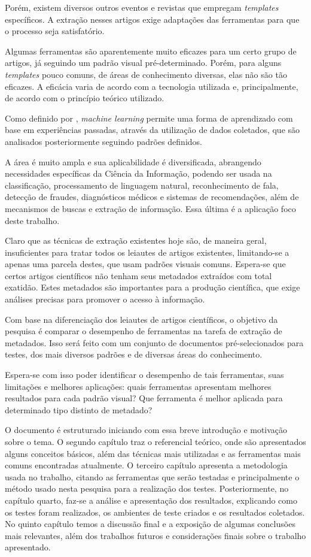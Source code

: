 Porém, existem diversos outros eventos e revistas que empregam \textit{templates} específicos. A extração nesses artigos exige adaptações das ferramentas para que o processo seja satisfatório.

Algumas ferramentas são aparentemente muito eficazes para um certo grupo de artigos, já seguindo um padrão visual pré-determinado. Porém, para alguns \textit{templates} pouco comuns, de áreas de conhecimento diversas, elas não são tão eficazes. A eficácia varia de acordo com a tecnologia utilizada e, principalmente, de acordo com o princípio teórico utilizado.

Como definido por \cite{foundations-machine-learning}, \textit{machine learning} permite uma forma de aprendizado com base em experiências passadas, através da utilização de dados coletados, que são analisados posteriormente seguindo padrões definidos.

A área é muito ampla e sua aplicabilidade é diversificada, abrangendo necessidades específicas da Ciência da Informação, podendo ser usada na classificação, processamento de linguagem natural, reconhecimento de fala, detecção de fraudes, diagnósticos médicos e sistemas de recomendações, além de mecanismos de buscas e extração de informação. Essa última é a aplicação foco deste trabalho.

Claro que as técnicas de extração existentes hoje são, de maneira geral, insuficientes para tratar todos os leiautes de artigos existentes, limitando-se a apenas uma parcela destes, que usam padrões visuais comuns. Espera-se que certos artigos científicos não tenham seus metadados extraídos com total exatidão. Estes metadados são importantes para a produção científica, que exige  análises precisas para promover o acesso à informação.

Com base na diferenciação dos leiautes de artigos científicos, o objetivo da pesquisa é comparar o desempenho de ferramentas na tarefa de extração de metadados. Isso será feito com um conjunto de documentos pré-selecionados para testes, dos mais diversos padrões e de diversas áreas do conhecimento.

Espera-se com isso poder identificar o desempenho de tais ferramentas, suas limitações e melhores aplicações: quais ferramentas apresentam melhores resultados para cada padrão visual? Que ferramenta é melhor aplicada para determinado tipo distinto de metadado?

O documento é estruturado iniciando com essa breve introdução e motivação sobre o tema. O segundo capítulo traz o referencial teórico, onde são apresentados alguns conceitos básicos, além das técnicas mais utilizadas e as ferramentas mais comuns encontradas atualmente. O terceiro capítulo apresenta a metodologia usada no trabalho, citando as ferramentas que serão testadas e principalmente o método usado nesta pesquisa para a realização dos testes. Posteriormente, no capítulo quarto, faz-se a análise e apresentação dos resultados, explicando como os testes foram realizados, os ambientes de teste criados e os resultados coletados. No quinto capítulo temos a discussão final e a exposição de algumas conclusões mais relevantes, além dos trabalhos futuros e considerações finais sobre o trabalho apresentado.

